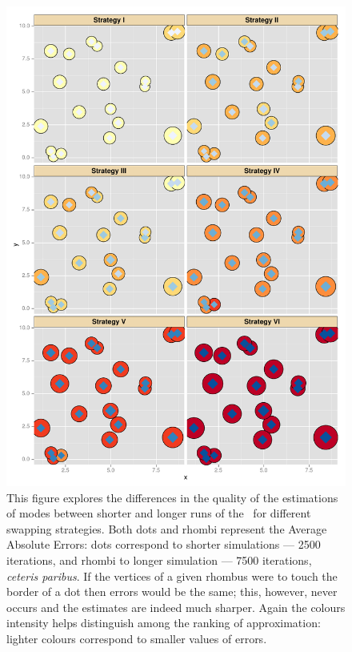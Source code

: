 \begin{figure}[ht]
	\centering \includegraphics[height=.7\textheight,keepaspectratio=TRUE]{./img/bigSimulationOverlayed.pdf}
	\caption[Average Absolute Errors comparison between 2500 and 7500 iteration-long runs of the \PT.]{
		This figure explores the differences in the quality of the estimations of modes between shorter and longer runs of the \PT\, for different swapping strategies. Both dots and rhombi represent the Average Absolute Errors: dots correspond to shorter simulations --- 2500 iterations, and rhombi to longer simulation --- 7500 iterations, {\it ceteris paribus}. If the vertices of a given rhombus were to touch the border of a dot then errors would be the same; this, however, never occurs and the estimates are indeed much sharper. Again the colours intensity helps distinguish among the ranking of approximation: lighter colours correspond to smaller values of errors. 
	}\label{shortAndLongSimulations}
\end{figure}




